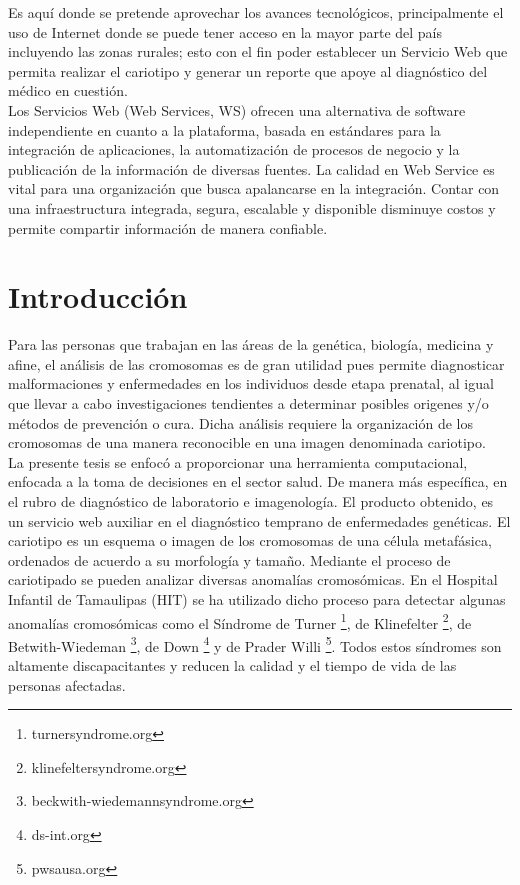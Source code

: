 \documentclass[12pt,letterpaper,titlepage]{article}
\begin{document}
Es aquí donde se pretende aprovechar los avances tecnológicos, principalmente el uso de Internet donde se puede tener acceso en la mayor parte del país incluyendo las zonas rurales; esto con el fin poder establecer un Servicio Web que permita realizar el cariotipo y generar un reporte que apoye al diagnóstico del médico en cuestión.\\

Los Servicios Web (Web Services, WS) ofrecen una alternativa de software independiente en cuanto a la plataforma, basada en estándares para la integración de aplicaciones, la automatización de procesos de negocio y la publicación de la información de diversas fuentes. La calidad en Web Service es vital para una organización que busca apalancarse en la integración. Contar con una infraestructura integrada, segura, escalable y disponible disminuye costos y permite compartir información de manera confiable.\\
\newpage
\chapter{Introducción}\label{cap1}


Para las personas que trabajan en las áreas de la genética, biología, medicina y afine, el análisis de las cromosomas es de gran utilidad pues permite diagnosticar malformaciones y enfermedades en los individuos desde etapa prenatal, al igual que llevar a cabo investigaciones tendientes a determinar posibles origenes y/o métodos de prevención o cura. Dicha análisis requiere  la organización de los cromosomas de una manera reconocible en una imagen denominada cariotipo.\\

La presente tesis se enfocó a proporcionar una herramienta computacional, enfocada a la toma de decisiones en el sector salud. De manera más específica, en el rubro de diagnóstico de laboratorio e imagenología. El producto obtenido, es un servicio web auxiliar en el diagnóstico temprano de enfermedades genéticas. El cariotipo es un esquema o imagen de los cromosomas de una célula metafásica, ordenados de acuerdo a su morfología y tamaño. Mediante el proceso de cariotipado se pueden analizar diversas anomalías cromosómicas. En el Hospital Infantil de Tamaulipas (HIT) se ha utilizado dicho proceso para detectar algunas anomalías cromosómicas como el Síndrome de Turner \footnote{turnersyndrome.org}, de Klinefelter \footnote{klinefeltersyndrome.org}, de Betwith-Wiedeman \footnote{beckwith-wiedemannsyndrome.org}, de Down \footnote{ds-int.org} y de Prader Willi \footnote{pwsausa.org}. Todos estos síndromes son altamente discapacitantes y reducen la calidad y el tiempo de vida de las personas afectadas. \\
\end{document}
